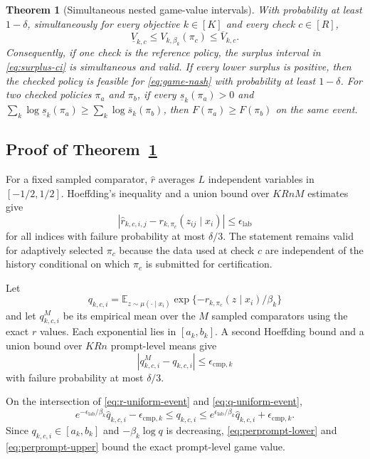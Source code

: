 \documentclass{article}
\newtheorem{theorem}{Theorem}
\theoremstyle{remark}
\theoremstyle{plain}
\newcommand{\E}{\mathbb{E}}
\begin{document}
\begin{theorem}[Simultaneous nested game-value intervals]
\label{thm:game-value-ci}
With probability at least $1-\delta$, simultaneously for every objective $k\in[K]$ and every check $c\in[R]$,
\begin{equation}
\underline V_{k,c}
\le V_{k,\beta_k}(\pi_c)
\le\overline V_{k,c}.
\label{eq:ci-guarantee}
\end{equation}
Consequently, if one check is the reference policy, the surplus interval in \eqref{eq:surplus-ci} is simultaneous and valid. If every lower surplus is positive, then the checked policy is feasible for \eqref{eq:game-nash} with probability at least $1-\delta$. For two checked policies $\pi_a$ and $\pi_b$, if every $\underline s_k(\pi_a)>0$ and
$\sum_k\log\underline s_k(\pi_a)\ge\sum_k\log\overline s_k(\pi_b)$, then $F(\pi_a)\ge F(\pi_b)$ on the same event.
\end{theorem}

\subsection{Proof of Theorem~\ref{thm:game-value-ci}}
For a fixed sampled comparator, $\widehat r$ averages $L$ independent variables in $[-1/2,1/2]$. Hoeffding's inequality \citep{hoeffding1963probability} and a union bound over $KRnM$ estimates give
\begin{equation}
|\widehat r_{k,c,i,j}-r_{k,\pi_c}(z_{ij}\mid x_i)|
\le\epsilon_{\mathrm{lab}}
\label{eq:r-uniform-event}
\end{equation}
for all indices with failure probability at most $\delta/3$. The statement remains valid for adaptively selected $\pi_c$ because the data used at check $c$ are independent of the history conditional on which $\pi_c$ is submitted for certification.

Let
\[
q_{k,c,i}
=\E_{z\sim\mu(\cdot\mid x_i)}
\exp\{-r_{k,\pi_c}(z\mid x_i)/\beta_k\}
\]
and let $q^M_{k,c,i}$ be its empirical mean over the $M$ sampled comparators using the exact $r$ values. Each exponential lies in $[a_k,b_k]$. A second Hoeffding bound and a union bound over $KRn$ prompt-level means give
\begin{equation}
|q^M_{k,c,i}-q_{k,c,i}|
\le\epsilon_{\mathrm{cmp},k}
\label{eq:q-uniform-event}
\end{equation}
with failure probability at most $\delta/3$.

On the intersection of \eqref{eq:r-uniform-event} and \eqref{eq:q-uniform-event},
\[
e^{-\epsilon_{\mathrm{lab}}/\beta_k}\widehat q_{k,c,i}
-\epsilon_{\mathrm{cmp},k}
\le q_{k,c,i}
\le
e^{\epsilon_{\mathrm{lab}}/\beta_k}\widehat q_{k,c,i}
+\epsilon_{\mathrm{cmp},k}.
\]
Since $q_{k,c,i}\in[a_k,b_k]$ and $-\beta_k\log q$ is decreasing, \eqref{eq:perprompt-lower} and \eqref{eq:perprompt-upper} bound the exact prompt-level game value.
\end{document}
